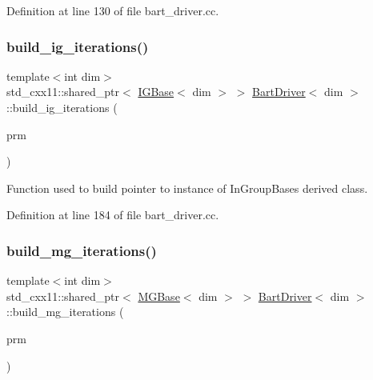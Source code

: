 Definition at line 130 of file bart\+\_\+driver.\+cc.

\mbox{\label{class_bart_driver_adc7ebcc2b3d02b7058410abef7e1b8a5}} 
\subsubsection{\texorpdfstring{build\+\_\+ig\+\_\+iterations()}{build\_ig\_iterations()}}
{\footnotesize\ttfamily template$<$int dim$>$ \\
std\+\_\+cxx11\+::shared\+\_\+ptr$<$ \hyperlink{class_i_g_base}{I\+G\+Base}$<$ dim $>$ $>$ \hyperlink{class_bart_driver}{Bart\+Driver}$<$ dim $>$\+::build\+\_\+ig\+\_\+iterations (\begin{DoxyParamCaption}\item[{const Parameter\+Handler \&}]{prm }\end{DoxyParamCaption})\hspace{0.3cm}{\ttfamily [private]}}



Function used to build pointer to instance of In\+Group\+Base\textquotesingle{}s derived class. 



Definition at line 184 of file bart\+\_\+driver.\+cc.

\mbox{\label{class_bart_driver_af0c96d5fe57cdb8df75e1fb93ce6196b}} 
\subsubsection{\texorpdfstring{build\+\_\+mg\+\_\+iterations()}{build\_mg\_iterations()}}
{\footnotesize\ttfamily template$<$int dim$>$ \\
std\+\_\+cxx11\+::shared\+\_\+ptr$<$ \hyperlink{class_m_g_base}{M\+G\+Base}$<$ dim $>$ $>$ \hyperlink{class_bart_driver}{Bart\+Driver}$<$ dim $>$\+::build\+\_\+mg\+\_\+iterations (\begin{DoxyParamCaption}\item[{const Parameter\+Handler \&}]{prm }\end{DoxyParamCaption})\hspace{0.3cm}{\ttfamily [private]}}



